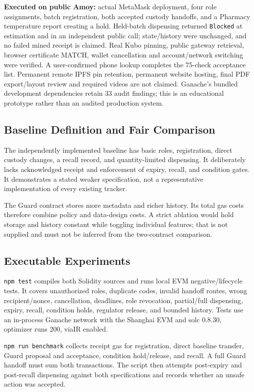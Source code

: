 \textbf{Executed on public Amoy:} actual MetaMask deployment, four role assignments, batch registration, both accepted custody handoffs, and a Pharmacy temperature report creating a hold. Held-batch dispensing returned \texttt{Blocked} at estimation and in an independent public call; state/history were unchanged, and no failed mined receipt is claimed. Real Kubo pinning, public gateway retrieval, browser certificate MATCH, wallet cancellation and account/network switching were verified. A user-confirmed phone lookup completes the 75-check acceptance list. Permanent remote IPFS pin retention, permanent website hosting, final PDF export/layout review and required videos are not claimed. Ganache's bundled development dependencies retain 33 audit findings; this is an educational prototype rather than an audited production system.

\subsection{Baseline Definition and Fair Comparison}
The independently implemented baseline has basic roles, registration, direct custody changes, a recall record, and quantity-limited dispensing. It deliberately lacks acknowledged receipt and enforcement of expiry, recall, and condition gates. It demonstrates a stated weaker specification, not a representative implementation of every existing tracker.

The Guard contract stores more metadata and richer history. Its total gas costs therefore combine policy and data-design costs. A strict ablation would hold storage and history constant while toggling individual features; that is not supplied and must not be inferred from the two-contract comparison.

\subsection{Executable Experiments}
\texttt{npm test} compiles both Solidity sources and runs local EVM negative/lifecycle tests. It covers unauthorized roles, duplicate codes, invalid handoff routes, wrong recipient/nonce, cancellation, deadlines, role revocation, partial/full dispensing, expiry, recall, condition holds, regulator release, and bounded history. Tests use an in-process Ganache network with the Shanghai EVM and solc 0.8.30, optimizer runs 200, viaIR enabled.

\texttt{npm run benchmark} collects receipt gas for registration, direct baseline transfer, Guard proposal and acceptance, condition hold/release, and recall. A full Guard handoff must sum both transactions. The script then attempts post-expiry and post-recall dispensing against both specifications and records whether an unsafe action was accepted.

